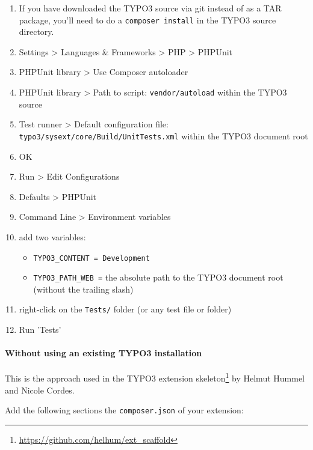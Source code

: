\documentclass[a4paper,10pt,headsepline]{scrartcl}
\begin{document}
\begin{enumerate}
  \item If you have downloaded the TYPO3 source via git instead of as a TAR package, you'll need to do a \texttt{composer install} in the TYPO3 source directory.
  \item Settings > Languages \& Frameworks > PHP > PHPUnit
  \item PHPUnit library > Use Composer autoloader
  \item PHPUnit library > Path to script: \texttt{vendor/autoload} within the TYPO3 source
  \item Test runner > Default configuration file: \texttt{typo3/sysext/core/Build/UnitTests.xml} within the TYPO3 document root
  \item OK
  \item Run > Edit Configurations
  \item Defaults > PHPUnit
  \item Command Line > Environment variables
  \item add two variables:
    \begin{itemize}
      \item \texttt{TYPO3\_CONTENT = Development}
      \item \texttt{TYPO3\_PATH\_WEB =} the absolute path to the TYPO3 document root (without the trailing slash)
    \end{itemize}
  \item right-click on the \texttt{Tests/} folder (or any test file or folder)
  \item Run 'Tests'
\end{enumerate}


\paragraph{Without using an existing TYPO3 installation}

This is the approach used in the TYPO3 extension skeleton\footnote{\url{https://github.com/helhum/ext_scaffold}} by Helmut Hummel and Nicole Cordes.

Add the following sections the \texttt{composer.json} of your extension:

\small
{}
\normalsize
\end{document}
